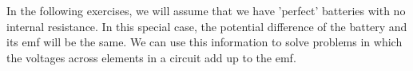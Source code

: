         \label{m38772*id64677}In the following exercises, we will assume that we have 'perfect' batteries with no internal resistance. In this special case, the potential difference of the battery and its emf will be the same. We can use this information to solve problems in which the voltages across elements in a circuit add up to the emf.\par 
        \label{m38772*id64681}\nopagebreak\noindent{}
    
